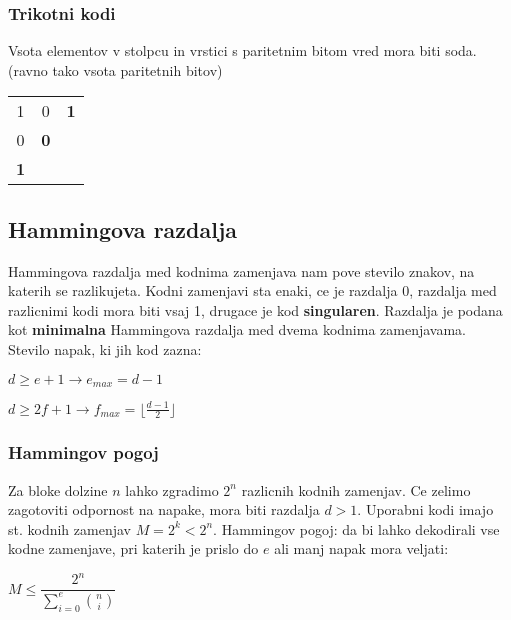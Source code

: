 \documentclass{article}
\begin{document}
\begin{multicols}{3}
\subsubsection{Trikotni kodi}
Vsota elementov v stolpcu in vrstici s paritetnim bitom vred mora biti soda. (ravno tako vsota paritetnih bitov)
\begin{center}
    \begin{tabular}{ ccc } 
        1   & 0 & \textbf{1} \\ 
        0   & \textbf{0} &  \\ 
        \textbf{1}   &  &  \\ 
    \end{tabular}
\end{center}

\subsection{Hammingova razdalja}
Hammingova razdalja med kodnima zamenjava nam pove stevilo znakov, na katerih se razlikujeta. Kodni zamenjavi sta enaki,
ce je razdalja 0, razdalja med razlicnimi kodi mora biti vsaj 1, drugace je kod \textbf{singularen}.
Razdalja je podana kot \textbf{minimalna} Hammingova razdalja med dvema kodnima zamenjavama.
Stevilo napak, ki jih kod zazna:
\begin{center}
    $d \geq e + 1 \rightarrow e_{max} = d-1$
\end{center}
\begin{center}
    $d \geq 2f + 1 \rightarrow f_{max} = \lfloor \frac{d-1}{2} \rfloor$
\end{center}

\subsubsection{Hammingov pogoj}
Za bloke dolzine $n$ lahko zgradimo $2^n$ razlicnih kodnih zamenjav. Ce zelimo zagotoviti odpornost na napake,
mora biti razdalja $d > 1$. Uporabni kodi imajo st. kodnih zamenjav $M = 2^k < 2^n$.
Hammingov pogoj: da bi lahko dekodirali vse kodne zamenjave, pri katerih je prislo do $e$ ali manj napak
mora veljati:
\begin{center}
    \begin{math}
        M \leq \dfrac{2^n}{\sum_{i=0}^e{n \choose i}}
    \end{math}
\end{center}


\end{multicols}
\end{document}
